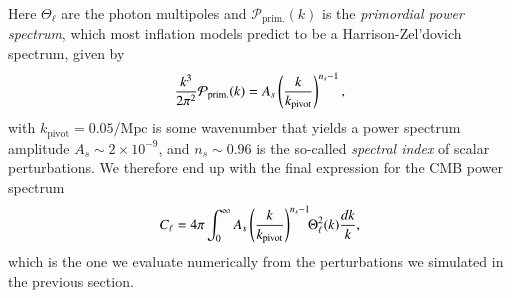 \documentclass[twocolumn]{aa}
\begin{document}
Here $\Theta_\ell$ are the photon multipoles and $\mathcal{P}_\text{prim.}(k)$ is the \textit{primordial power spectrum}, which most inflation models predict to be a Harrison-Zel'dovich spectrum, given by
\begin{align*}
      \frac{k^3}{2\pi^2} \mathcal{P}_{\rm prim.}(k) = A_s \left(\frac{k}{k_{\rm pivot}}\right)^{n_s-1},
\end{align*}
with $k_\text{pivot}=0.05/\mbox{Mpc}$ is some wavenumber that yields a power spectrum amplitude $A_s\sim 2\times 10^{-9}$, and $n_s\sim 0.96$ is the so-called \textit{spectral index} of scalar perturbations. We therefore end up with the final expression for the CMB power spectrum
\begin{align}
      C_\ell = 4\pi \int_0^{\infty} A_s \left(\frac{k}{k_{\rm pivot}}\right)^{n_s-1}\!\! \Theta_\ell^2(k) \frac{dk}{k},\label{eq:cell}
\end{align}
which is the one we evaluate numerically from the perturbations we simulated in the previous section.
\end{document}
